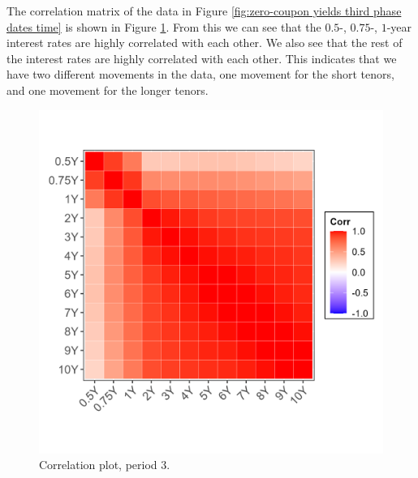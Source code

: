 \vfill

\newpage

The correlation matrix of the data in Figure \ref{fig:zero-coupon yields third phase dates time} is shown in Figure \ref{fig:corr plot}. From this we can see that the $0.5$-, $0.75$-, $1$-year interest rates are highly correlated with each other. We also see that the rest of the interest rates are highly correlated with each other. This indicates that we have two different movements in the data, one movement for the short tenors, and one movement for the longer tenors.

\begin{figure}[H]
    \centering
    \includegraphics[width=0.5\linewidth]{Figures/Correlation/zero_coupon_yields_phase_3_correlation.png}
    \caption[Correlation plot, Period $3$.]{Correlation plot, period $3$.}
    \label{fig:corr plot}
\end{figure}
